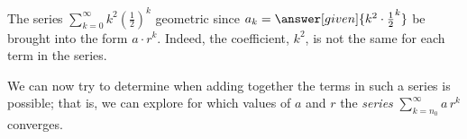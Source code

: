 \documentclass{ximera}
\begin{document}
\begin{example}
The series $\sum\limits_{k=0}^\infty k^2 \left(\frac{1}{2}\right)^k$  geometric since $a_k = \answer[given]{k^2 \cdot \frac{1}{2}^k}$  be brought into the form $a \cdot r^k$.  Indeed, the coefficient, $k^2$, is not the same for each term in the series.
\end{example}

We can now try to determine when adding together the terms in such a series is possible; that is, we can explore for which values of $a$ and $r$ the \emph{series} $\sum\limits_{k=n_0}^{\infty} a \, r^k$ converges.  
\end{document}
